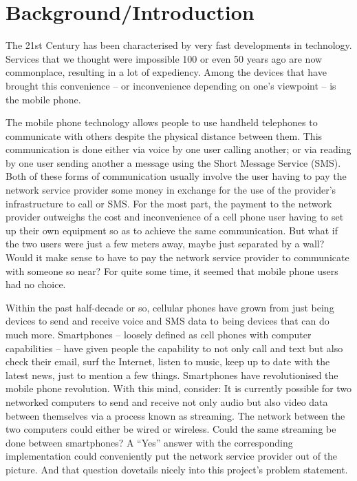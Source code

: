 \documentclass[12pt,svgnames,smaller]{article} %
\begin{document}
\clearpage


\tableofcontents
\clearpage


\section{ \textbf{ Background/Introduction } }
 
	The 21st Century has been characterised by very fast developments in technology. Services that we thought were impossible 100 or even 50 years ago are now commonplace, resulting in a lot of expediency. Among the devices that have brought this convenience – or inconvenience depending on one’s viewpoint – is the mobile phone.

	The mobile phone technology allows people to use handheld telephones to communicate with others despite the physical distance between them. This communication is done either via voice by one user calling another; or via reading by one user sending another a message using the Short Message Service (SMS). Both of these forms of communication usually involve the user having to pay the network service provider some money in exchange for the use of the provider’s infrastructure to call or SMS.  For the most part, the payment to the network provider outweighs the cost and inconvenience of a cell phone user having to set up their own equipment so as to achieve the same communication. But what if the two users were just a few meters away, maybe just separated by a wall? Would it make sense to have to pay the network service provider to communicate with someone so near? For quite some time, it seemed that mobile phone users had no choice.
	
	Within the past half-decade or so, cellular phones have grown from just being devices to send and receive voice and SMS data to being devices that can do much more. Smartphones – loosely defined as cell phones with computer capabilities – have given people the capability to not only call and text but also check their email, surf the Internet, listen to music, keep up to date with the latest news, just to mention a few things. Smartphones have revolutionised the mobile phone revolution. With this mind, consider: It is currently possible for two networked computers to send and receive not only audio but also video data between themselves via a process known as streaming. The network between the two computers could either be wired or wireless. Could the same streaming be done between smartphones? A “Yes” answer with the corresponding implementation could conveniently put the network service provider out of the picture. And that question dovetails nicely into this project’s problem statement.
\end{document}
